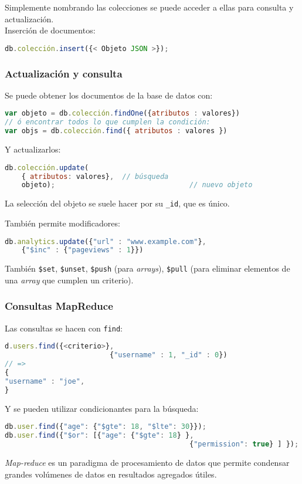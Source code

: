 Simplemente nombrando las colecciones se puede acceder a ellas para consulta y actualización.\\
Inserción de documentos:
\begin{lstlisting}[language=JavaScript]
db.colección.insert({< Objeto JSON >});
\end{lstlisting}
\subsubsection{Actualización y consulta}
Se puede obtener los documentos de la base de datos con:
\begin{lstlisting}[language=JavaScript]
var objeto = db.colección.findOne({atributos : valores})
// ó encontrar todos lo que cumplen la condición:
var objs = db.colección.find({ atributos : valores })
\end{lstlisting}
Y actualizarlos:
\begin{lstlisting}[language=JavaScript]
db.colección.update(
	{ atributos: valores}, 	// búsqueda
	objeto);								// nuevo objeto
\end{lstlisting}
La selección del objeto se suele hacer por su \texttt{_id}, que es único.

También permite modificadores:

\begin{lstlisting}[language=JavaScript]
	db.analytics.update({"url" : "www.example.com"},
	{"$inc" : {"pageviews" : 1}})
\end{lstlisting}

También \texttt{\$set}, \texttt{\$unset}, \texttt{\$push} (para \textit{arrays}), \texttt{\$pull} (para eliminar elementos de una \textit{array} que cumplen un criterio).
\subsubsection{Consultas MapReduce}
Las consultas se hacen con \texttt{find}:
\begin{lstlisting}[language=JavaScript]
d.users.find({<criterio>},
						 {"username" : 1, "_id" : 0})
// =>
{
"username" : "joe",
}
\end{lstlisting}
Y se pueden utilizar condicionantes para la búsqueda:
\begin{lstlisting}[language = JavaScript]
db.user.find({"age": {"$gte": 18, "$lte": 30}});
db.user.find({"$or": [{"age": {"$gte": 18} },
											{"permission": true} ] });
\end{lstlisting}

\textit{Map-reduce} es un paradigma de procesamiento de datos que permite condensar grandes volúmenes de datos en resultados agregados útiles.

